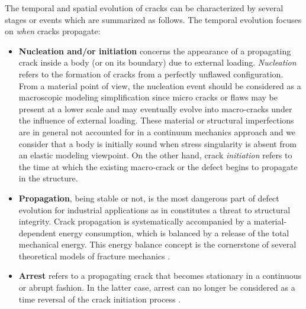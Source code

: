 The temporal and spatial evolution of cracks can be characterized by several stages or events which are summarized as follows. The temporal evolution focuses on \emph{when} cracks propagate:
\begin{itemize}
\item \textbf{Nucleation and/or initiation} concerns the appearance of a propagating crack inside a body (or on its boundary) due to external loading. \emph{Nucleation} refers to the formation of cracks from a perfectly unflawed configuration. From a material point of view, the nucleation event should be considered as a macroscopic modeling simplification since micro cracks or flaws may be present at a lower scale and may eventually evolve into macro-cracks under the influence of external loading. These material or structural imperfections are in general not accounted for in a continuum mechanics approach and we consider that a body is initially sound when stress singularity is absent from an elastic modeling viewpoint. On the other hand, crack \emph{initiation} refers to the time at which the existing macro-crack or the defect begins to propagate in the structure.

\item \textbf{Propagation}, being stable or not, is
the most dangerous part of defect evolution for industrial applications as in constitutes a threat to structural integrity. Crack propagation is systematically accompanied by a material-dependent energy consumption, which is balanced by a release of the total mechanical energy. This energy balance concept is the cornerstone of several theoretical models of fracture mechanics \cite{Griffith:1921,Mott:1947}.

\item \textbf{Arrest} refers to a propagating crack that becomes stationary in a continuous or abrupt fashion. In the latter case, arrest can no longer be considered as a time reversal of the crack initiation process \cite{Ravi-ChandarKnauss:1984c}.
\end{itemize}

